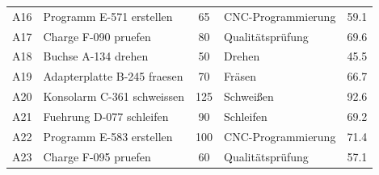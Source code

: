 \begin{longtable}{@{}llS[table-format=3.0]lS[table-format=3.1]@{}}
  A16 & Programm E-571 erstellen & 65 & CNC-Programmierung & 59.1 \\
  A17 & Charge F-090 pruefen & 80 & Qualitätsprüfung & 69.6 \\
  A18 & Buchse A-134 drehen & 50 & Drehen & 45.5 \\
  A19 & Adapterplatte B-245 fraesen & 70 & Fräsen & 66.7 \\
  A20 & Konsolarm C-361 schweissen & 125 & Schweißen & 92.6 \\
  A21 & Fuehrung D-077 schleifen & 90 & Schleifen & 69.2 \\
  A22 & Programm E-583 erstellen & 100 & CNC-Programmierung & 71.4 \\
  A23 & Charge F-095 pruefen & 60 & Qualitätsprüfung & 57.1 \\
\end{longtable}
